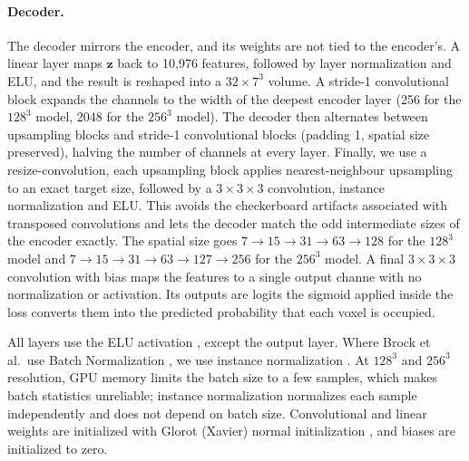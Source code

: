 \paragraph{Decoder.}                     %
The decoder mirrors the encoder, and its weights are not tied to the encoder's. A linear
layer maps $\mathbf{z}$ back to 10,976 features, followed by layer
normalization \cite{ba2016} and ELU, and the result is reshaped into a $32\times7^3$ volume.
A stride-1 convolutional block expands the channels to the width of the deepest encoder layer
(256 for the $128^3$ model, 2048 for the $256^3$ model). The decoder then alternates between
upsampling blocks and stride-1 convolutional blocks (padding 1, spatial size preserved),
halving the number of channels at every layer. Finally, we use a resize-convolution, each upsampling block applies nearest-neighbour
upsampling to an exact target size, followed by a $3\times3\times3$ convolution, instance
normalization and ELU. This avoids the checkerboard artifacts associated with transposed
convolutions \cite{odena2016} and lets the decoder match the odd intermediate sizes of the
encoder exactly. The spatial size goes
$7 \to 15 \to 31 \to 63 \to 128$ for the $128^3$ model and
$7 \to 15 \to 31 \to 63 \to 127 \to 256$ for the $256^3$ model. A final $3\times3\times3$ convolution with bias maps the features to a single output channe
with no normalization or activation. Its outputs are logits the sigmoid applied inside the
loss converts them into the predicted probability that each voxel is occupied.

All layers use the ELU activation \cite{clevert2016}, except the output layer. Where Brock et
al.\ use Batch Normalization \cite{ioffe2015}, we use instance
normalization \cite{ulyanov2016}. At $128^3$ and $256^3$ resolution, GPU memory limits the
batch size to a few samples, which makes batch statistics unreliable; instance normalization
normalizes each sample independently and does not depend on batch size. Convolutional and
linear weights are initialized with Glorot (Xavier) normal initialization \cite{glorot2010},
and biases are initialized to zero.

